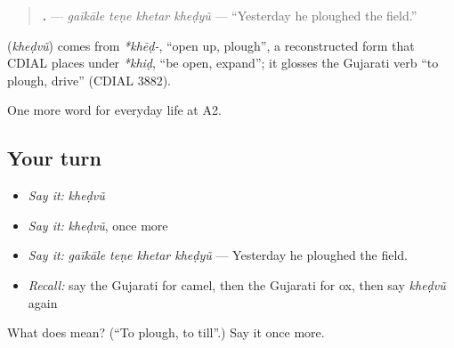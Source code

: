 \begin{quote}
\textbf{   .} — \emph{gaīkāle teṇe khetar kheḍyũ} — \textquotedblleft{}Yesterday he ploughed the field.\textquotedblright{}
\end{quote}

\begin{cousinweb}
\textbf{} (\emph{kheḍvũ}) comes from \emph{*khēḍ-}, \textquotedblleft{}open up, plough\textquotedblright{}, a reconstructed form that CDIAL places under \emph{*khiḍ}, \textquotedblleft{}be open, expand\textquotedblright{}; it glosses the Gujarati verb \textquotedblleft{}to plough, drive\textquotedblright{} (CDIAL 3882).
\end{cousinweb}

\begin{grammarlens}[title={What you've built}]
One more word for everyday life at A2.
\end{grammarlens}

\subsection*{Your turn}
\begin{itemize}
\raggedright
  \item \emph{Say it:} \emph{kheḍvũ}
  \item \emph{Say it:} \emph{kheḍvũ}, once more
  \item \emph{Say it:} \emph{gaīkāle teṇe khetar kheḍyũ} — Yesterday he ploughed the field.
  \item \emph{Recall:} say the Gujarati for camel, then the Gujarati for ox, then say \emph{kheḍvũ} again
\end{itemize}

\begin{tcolorbox}[breakable,colback=teal!4,colframe=teal!35!black,title={Before you move on}]
What does  mean? (\textquotedblleft{}To plough, to till\textquotedblright{}.) Say it once more.
\end{tcolorbox}
